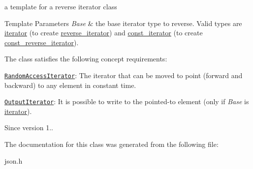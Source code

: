 a template for a reverse iterator class 


\begin{DoxyTemplParams}{Template Parameters}
{\em Base} & the base iterator type to reverse. Valid types are \hyperlink{classnlohmann_1_1basic__json_a099316232c76c034030a38faa6e34dca}{iterator} (to create \hyperlink{classnlohmann_1_1basic__json_ac223d5560c2b05a208c88de67376c5f2}{reverse\+\_\+iterator}) and \hyperlink{classnlohmann_1_1basic__json_a41a70cf9993951836d129bb1c2b3126a}{const\+\_\+iterator} (to create \hyperlink{classnlohmann_1_1basic__json_a72be3c24bfa24f0993d6c11af03e7404}{const\+\_\+reverse\+\_\+iterator}).\\
\hline
\end{DoxyTemplParams}
The class satisfies the following concept requirements\+:
\begin{DoxyItemize}
\item \href{http://en.cppreference.com/w/cpp/concept/RandomAccessIterator}{\tt Random\+Access\+Iterator}\+: The iterator that can be moved to point (forward and backward) to any element in constant time.
\item \href{http://en.cppreference.com/w/cpp/concept/OutputIterator}{\tt Output\+Iterator}\+: It is possible to write to the pointed-\/to element (only if {\itshape Base} is \hyperlink{classnlohmann_1_1basic__json_a099316232c76c034030a38faa6e34dca}{iterator}).
\end{DoxyItemize}

\begin{DoxySince}{Since}
version 1.. 
\end{DoxySince}


The documentation for this class was generated from the following file\+:\begin{DoxyCompactItemize}
\item 
json.\+h\end{DoxyCompactItemize}
